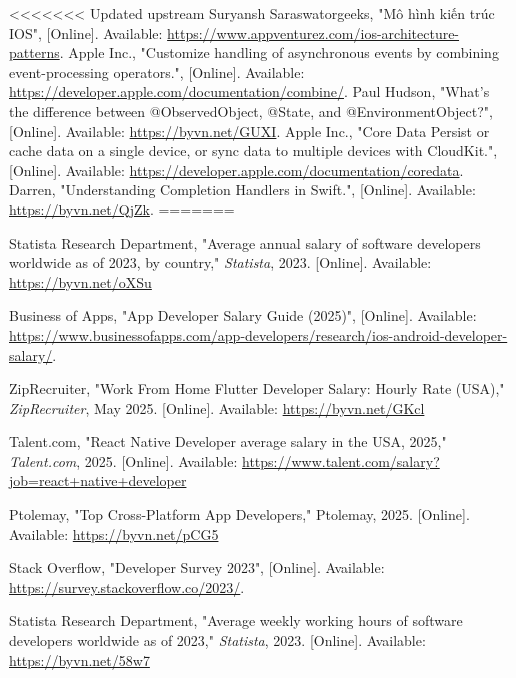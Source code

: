 \documentclass[12pt]{report}
\begin{document}
\begin{thebibliography}{1}
<<<<<<< Updated upstream
Suryansh Saraswatorgeeks, "Mô hình kiến trúc IOS", [Online]. Available: \url{https://www.appventurez.com/ios-architecture-patterns}.
Apple Inc., "Customize handling of asynchronous events by combining event-processing operators.", [Online]. Available: \url{https://developer.apple.com/documentation/combine/}.
 Paul Hudson, "What’s the difference between @ObservedObject, @State, and @EnvironmentObject?", [Online]. Available: \url{https://byvn.net/GUXI}.
 Apple Inc., "Core Data Persist or cache data on a single device, or sync data to multiple devices with CloudKit.", [Online]. Available: \url{https://developer.apple.com/documentation/coredata}.
 Darren, "Understanding Completion Handlers in Swift.", [Online]. Available: \url{https://byvn.net/QjZk}.
=======

    Statista Research Department, "Average annual salary of software developers worldwide as of 2023, by country," \emph{Statista}, 2023. [Online]. Available: \url{https://byvn.net/oXSu}

    Business of Apps, "App Developer Salary Guide (2025)", [Online]. Available: \url{https://www.businessofapps.com/app-developers/research/ios-android-developer-salary/}.

    ZipRecruiter, "Work From Home Flutter Developer Salary: Hourly Rate (USA)," \emph{ZipRecruiter}, May 2025. [Online]. Available: \url{https://byvn.net/GKcl}

    Talent.com, "React Native Developer average salary in the USA, 2025," \emph{Talent.com}, 2025. [Online]. Available: \url{https://www.talent.com/salary?job=react+native+developer}

Ptolemay, "Top Cross-Platform App Developers," Ptolemay, 2025. [Online]. Available: \url{https://byvn.net/pCG5}

    
    Stack Overflow, "Developer Survey 2023", [Online]. Available: \url{https://survey.stackoverflow.co/2023/}.
    
Statista Research Department, "Average weekly working hours of software developers worldwide as of 2023," \emph{Statista}, 2023. [Online]. Available: \url{https://byvn.net/58w7}



\end{thebibliography}
\end{document}
